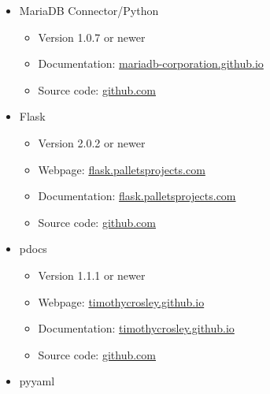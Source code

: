 \documentclass{scrreprt}
\begin{document}
\begin{itemize}
\begin{itemize}
\begin{itemize}
        \end{itemize}

        \item MariaDB Connector/Python
        \begin{itemize}

            \item Version 1.0.7 or newer
            \item Documentation: \href{https://mariadb-corporation.github.io/mariadb-connector-python/}{mariadb-corporation.github.io}
            \item Source code: \href{https://github.com/mariadb-corporation/mariadb-connector-python}{github.com}

        \end{itemize}

        \item Flask
        \begin{itemize}

            \item Version 2.0.2 or newer
            \item Webpage: \href{https://flask.palletsprojects.com/en/2.0.x/}{flask.palletsprojects.com}
            \item Documentation: \href{https://flask.palletsprojects.com/en/2.0.x/api/}{flask.palletsprojects.com}
            \item Source code: \href{https://github.com/pallets/flask}{github.com}

        \end{itemize}
        
        \item pdocs
        \begin{itemize}

            \item Version 1.1.1 or newer
            \item Webpage: \href{https://timothycrosley.github.io/pdocs/}{timothycrosley.github.io}
            \item Documentation: \href{https://timothycrosley.github.io/pdocs/reference/pdocs/api/}{timothycrosley.github.io}
            \item Source code: \href{https://github.com/timothycrosley/pdocs}{github.com} 

        \end{itemize}
        
        \item pyyaml
        \begin{itemize}
        

\end{itemize}
\end{itemize}
\end{itemize}
\end{document}
